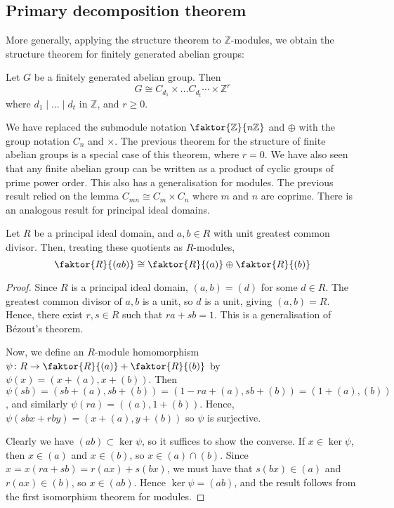 \subsection{Primary decomposition theorem}
More generally, applying the structure theorem to \( \mathbb Z \)-modules, we obtain the structure theorem for finitely generated abelian groups:
\begin{theorem}
	Let \( G \) be a finitely generated abelian group.
	Then
	\[ G \cong C_{d_1} \times \dots C_{d_t} \cdots \times \mathbb Z^r \]
	where \( d_1 \mid \dots \mid d_t \) in \( \mathbb Z \), and \( r \geq 0 \).
\end{theorem}
We have replaced the submodule notation \( \faktor{\mathbb Z}{n\mathbb Z} \) and \( \oplus \) with the group notation \( C_n \) and \( \times \).
The previous theorem for the structure of finite abelian groups is a special case of this theorem, where \( r = 0 \).
We have also seen that any finite abelian group can be written as a product of cyclic groups of prime power order.
This also has a generalisation for modules.
The previous result relied on the lemma \( C_{mn} \cong C_m \times C_n \) where \( m \) and \( n \) are coprime.
There is an analogous result for principal ideal domains.
\begin{lemma}
	Let \( R \) be a principal ideal domain, and \( a, b \in R \) with unit greatest common divisor.
	Then, treating these quotients as \( R \)-modules,
	\[ \faktor{R}{(ab)} \cong \faktor{R}{(a)} \oplus \faktor{R}{(b)} \]
\end{lemma}
\begin{proof}
	Since \( R \) is a principal ideal domain, \( (a,b) = (d) \) for some \( d \in R \).
	The greatest common divisor of \( a, b \) is a unit, so \( d \) is a unit, giving \( (a,b) = R \).
	Hence, there exist \( r,s \in R \) such that \( ra + sb = 1 \).
	This is a generalisation of B\'ezout's theorem.

	Now, we define an \( R \)-module homomorphism \( \psi \colon R \to \faktor{R}{(a)} + \faktor{R}{(b)} \) by \( \psi(x) = (x+(a), x+(b)) \).
	Then \( \psi(sb) = (sb+(a), sb+(b)) = (1-ra+(a),sb+(b)) = (1+(a), (b)) \), and similarly \( \psi(ra) = ((a),1+(b)) \).
	Hence, \( \psi(sbx + rby) = (x+(a),y+(b)) \) so \( \psi \) is surjective.

	Clearly we have \( (ab) \subset \ker \psi \), so it suffices to show the converse.
	If \( x \in \ker \psi \), then \( x \in (a) \) and \( x \in (b) \), so \( x \in (a) \cap (b) \).
	Since \( x = x(ra+sb) = r(ax) + s(bx) \), we must have that \( s(bx) \in (a) \) and \( r(ax) \in (b) \), so \( x \in (ab) \).
	Hence \( \ker \psi = (ab) \), and the result follows from the first isomorphism theorem for modules.
\end{proof}
